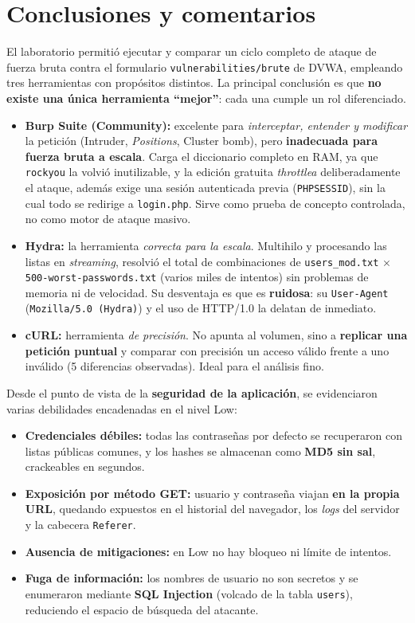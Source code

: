 \documentclass[letter,12pt]{article}
\begin{document}
\section*{Conclusiones y comentarios}

El laboratorio permitió ejecutar y comparar un ciclo completo de ataque de fuerza bruta contra el formulario \texttt{vulnerabilities/brute} de DVWA, empleando tres herramientas con propósitos distintos. La principal conclusión es que \textbf{no existe una única herramienta ``mejor''}: cada una cumple un rol diferenciado.

\begin{itemize}
    \item \textbf{Burp Suite (Community):} excelente para \emph{interceptar, entender y modificar} la petición (Intruder, \emph{Positions}, Cluster bomb), pero \textbf{inadecuada para fuerza bruta a escala}. Carga el diccionario completo en RAM, ya que \texttt{rockyou} la volvió inutilizable, y la edición gratuita \emph{throttlea} deliberadamente el ataque, además exige una sesión autenticada previa (\texttt{PHPSESSID}), sin la cual todo se redirige a \texttt{login.php}. Sirve como prueba de concepto controlada, no como motor de ataque masivo.
    \item \textbf{Hydra:} la herramienta \emph{correcta para la escala}. Multihilo y procesando las listas en \emph{streaming}, resolvió el total de combinaciones de \texttt{users\_mod.txt} $\times$ \texttt{500-worst-passwords.txt} (varios miles de intentos) sin problemas de memoria ni de velocidad. Su desventaja es que es \textbf{ruidosa}: su \texttt{User-Agent} (\texttt{Mozilla/5.0 (Hydra)}) y el uso de HTTP/1.0 la delatan de inmediato.
    \item \textbf{cURL:} herramienta \emph{de precisión}. No apunta al volumen, sino a \textbf{replicar una petición puntual} y comparar con precisión un acceso válido frente a uno inválido (5 diferencias observadas). Ideal para el análisis fino.
\end{itemize}

Desde el punto de vista de la \textbf{seguridad de la aplicación}, se evidenciaron varias debilidades encadenadas en el nivel Low:
\begin{itemize}
    \item \textbf{Credenciales débiles:} todas las contraseñas por defecto se recuperaron con listas públicas comunes, y los hashes se almacenan como \textbf{MD5 sin sal}, crackeables en segundos.
    \item \textbf{Exposición por método GET:} usuario y contraseña viajan \textbf{en la propia URL}, quedando expuestos en el historial del navegador, los \emph{logs} del servidor y la cabecera \texttt{Referer}.
    \item \textbf{Ausencia de mitigaciones:} en Low no hay bloqueo ni límite de intentos.
    
    \item \textbf{Fuga de información:} los nombres de usuario no son secretos y se enumeraron mediante \textbf{SQL Injection} (volcado de la tabla \texttt{users}), reduciendo el espacio de búsqueda del atacante.
\end{itemize}
\end{document}
